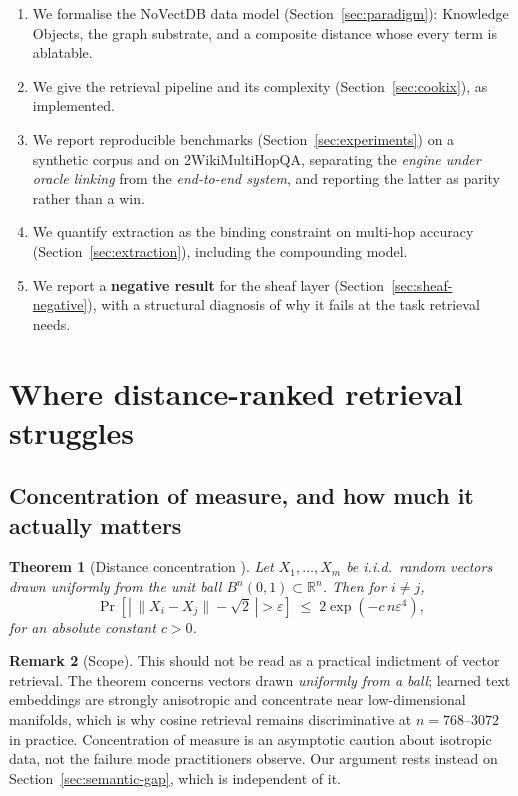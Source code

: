 \documentclass[11pt]{article}
\newtheorem{theorem}{Theorem}[section]
\theoremstyle{definition}
\newtheorem{remark}[theorem]{Remark}
\begin{document}
\begin{enumerate}
  \item We formalise the NoVectDB data model (Section~\ref{sec:paradigm}): Knowledge
  Objects, the graph substrate, and a composite distance whose every term is ablatable.
  \item We give the retrieval pipeline and its complexity
  (Section~\ref{sec:cookix}), as implemented.
  \item We report reproducible benchmarks (Section~\ref{sec:experiments}) on a
  synthetic corpus and on 2WikiMultiHopQA, separating the \emph{engine under oracle
  linking} from the \emph{end-to-end system}, and reporting the latter as parity rather
  than a win.
  \item We quantify extraction as the binding constraint on multi-hop accuracy
  (Section~\ref{sec:extraction}), including the compounding model.
  \item We report a \textbf{negative result} for the sheaf layer
  (Section~\ref{sec:sheaf-negative}), with a structural diagnosis of why it fails at
  the task retrieval needs.
\end{enumerate}

\section{Where distance-ranked retrieval struggles}

\subsection{Concentration of measure, and how much it actually matters}

\begin{theorem}[Distance concentration \cite{vershynin2018high}]
Let $X_1,\dots,X_m$ be i.i.d.\ random vectors drawn uniformly from the unit ball
$B^n(0,1)\subset\mathbb{R}^n$. Then for $i\neq j$,
\[
  \Pr\!\left[\left|\,\|X_i-X_j\| - \sqrt{2}\,\right| > \varepsilon\right]
  \;\le\; 2\exp\!\left(-c\,n\varepsilon^4\right),
\]
for an absolute constant $c>0$.
\end{theorem}

\begin{remark}[Scope]
\label{rem:concentration}
This should not be read as a practical indictment of vector retrieval. The theorem
concerns vectors drawn \emph{uniformly from a ball}; learned text embeddings are
strongly anisotropic and concentrate near low-dimensional manifolds, which is why
cosine retrieval remains discriminative at $n=768$--$3072$ in practice. Concentration
of measure is an asymptotic caution about isotropic data, not the failure mode
practitioners observe. Our argument rests instead on
Section~\ref{sec:semantic-gap}, which is independent of it.
\end{remark}
\end{document}

